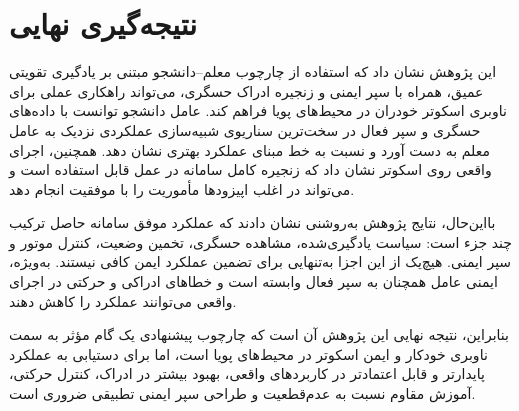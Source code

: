 \section{نتیجه‌گیری نهایی}
\label{sec:final_conclusion}

این پژوهش نشان داد که استفاده از چارچوب معلم--دانشجو مبتنی بر یادگیری تقویتی عمیق، همراه با سپر ایمنی و زنجیره ادراک حسگری، می‌تواند راهکاری عملی برای ناوبری اسکوتر خودران در محیط‌های پویا فراهم کند. عامل دانشجو توانست با داده‌های حسگری و سپر فعال در سخت‌ترین سناریوی شبیه‌سازی عملکردی نزدیک به عامل معلم به دست آورد و نسبت به خط مبنای  عملکرد بهتری نشان دهد. همچنین، اجرای واقعی روی اسکوتر نشان داد که زنجیره کامل سامانه در عمل قابل استفاده است و می‌تواند در اغلب اپیزودها مأموریت را با موفقیت انجام دهد.

بااین‌حال، نتایج پژوهش به‌روشنی نشان دادند که عملکرد موفق سامانه حاصل ترکیب چند جزء است: سیاست یادگیری‌شده، مشاهده حسگری، تخمین وضعیت، کنترل موتور و سپر ایمنی. هیچ‌یک از این اجزا به‌تنهایی برای تضمین عملکرد ایمن کافی نیستند. به‌ویژه، ایمنی عامل همچنان به سپر فعال وابسته است و خطاهای ادراکی و حرکتی در اجرای واقعی می‌توانند عملکرد را کاهش دهند.

بنابراین، نتیجه نهایی این پژوهش آن است که چارچوب پیشنهادی یک گام مؤثر به سمت ناوبری خودکار و ایمن اسکوتر در محیط‌های پویا است، اما برای دستیابی به عملکرد پایدارتر و قابل اعتمادتر در کاربردهای واقعی، بهبود بیشتر در ادراک، کنترل حرکتی، آموزش مقاوم نسبت به عدم‌قطعیت و طراحی سپر ایمنی تطبیقی ضروری است.